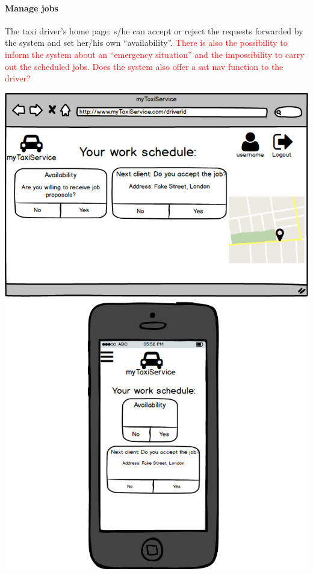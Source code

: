 \documentclass[a4paper,11pt]{report} %
\begin{document}
	\paragraph{Manage jobs} The taxi driver's home page: s/he can accept or reject the requests forwarded by the system and set her/his own ``availability''. \textcolor{red}{There is also the possibility to inform the system about an ``emergency situation'' and the impossibility to carry out the scheduled jobs. Does the system also offer a sat nav function to the driver?}
	\begin{center}
		\includegraphics[width=0.9\linewidth]{Pictures/DriverPage}
	\end{center}
	\pagebreak
	
\end{document}

